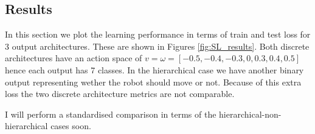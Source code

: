 \documentclass[a4paper,11pt]{report}
\begin{document}
\subsection{Results}\label{sec:sl_res}
In this section we plot the learning performance in terms of train and test loss for 3 output architectures. These are shown in Figures \ref{fig:SL_results}. Both discrete architectures have an action space of $v=\omega = [-0.5,-0.4,-0.3,0,0.3,0.4,0.5]$ hence each output has 7 classes. In the hierarchical case we have another binary output representing wether the robot should move or not. Because of this extra loss the two discrete architecture metrics are not comparable.

 I will perform a standardised comparison in terms of the hierarchical-non-hierarchical cases soon.

\begin{figure}[t]
	\centering
      \begin{subfigure}[b]{0.45\columnwidth}


\end{subfigure}
\end{figure}
\end{document}
